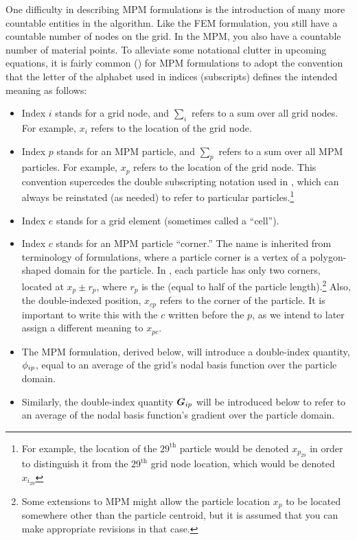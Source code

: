 One difficulty in describing MPM formulations is the introduction of many more countable entities in the algorithm. Like the FEM formulation, you still have a countable number of nodes on the grid. In the MPM, you also have a countable number of material points. To alleviate some notational clutter in upcoming equations, it is fairly common (\cf \cite{Bardenhagen2004}) for MPM formulations to adopt the convention that the letter of the alphabet used in indices (subscripts) defines the intended meaning as follows:
\begin{itemize}
  \item Index $i$ stands for a grid node, and $\sum_i$ refers to a sum over all grid nodes. For example, $x_i$ refers to the location of the \ith grid node.
  \item Index $p$ stands for an MPM particle, and $\sum_p$ refers to a sum over all MPM particles.  For example, $x_p$ refers to the location of the \pth grid node. This convention supercedes the double subscripting notation used in , which can always be reinstated (as needed) to refer to particular particles.\footnote{For example, the location of the $29^\text{th}$ particle would be denoted $x_{p_{29}}$ in order to distinguish it from the $29^\text{th}$ grid node location, which would be denoted $x_{i_{29}}$}
  \item Index $e$ stands for a grid element (sometimes called a ``cell'').
  \item Index $c$ stands for an MPM particle ``corner.''  The name  is inherited from terminology of \twoD formulations, where a particle corner is a vertex of a polygon-shaped domain for the particle. In \oneD, each particle has only two corners, located at $x_p\pm r_p$, where $r_p$ is the  (equal to half of the particle length).\footnote{Some extensions to MPM might allow the particle location $x_p$ to be located somewhere other than the particle centroid, but it is assumed that you can make appropriate revisions in that case.} Also, the double-indexed position, $x_{cp}$ refers to the \cth corner of the \pth particle.  It is important to write this with the $c$ written before the $p$, as we intend to later assign a different meaning to $x_{pc}$.
  \item The MPM formulation, derived below, will introduce a double-index quantity, ${\phi_{ip}}$, equal to an average of the grid's \ith nodal basis function over the \pth particle domain.
  \item Similarly, the double-index quantity ${\bm{G}_{ip}}$ will be introduced below to refer to an average of the \ith nodal basis function's gradient over the \pth particle domain.
\end{itemize}

